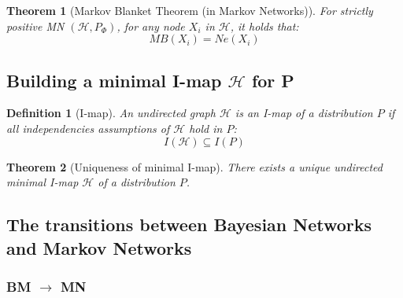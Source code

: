\documentclass[11pt]{article}
\numberwithin{equation}{section}
\theoremstyle{boldStyle}
\theoremstyle{boldBlueStyle}
\theoremstyle{boldPurpleStyle}
\newtheorem{theorem}{Theorem}[section]
\theoremstyle{boldRedStyle}
\newtheorem{definition}{Definition}[section]
\begin{document}
\begin{theorem}[Markov Blanket Theorem (in Markov Networks)]
    For strictly positive MN $(\mathcal{H}, P_{\Phi})$, for any node $X_i$ in $\mathcal{H}$, it holds that:
    \begin{equation*}
        MB(X_i) = Ne(X_i)
    \end{equation*}
\end{theorem}


\subsection{Building a minimal I-map $\mathcal{H}$ for P}

\begin{definition}[I-map]
    An undirected graph $\mathcal{H}$ is an I-map of a distribution $P$ if all independencies assumptions of $\mathcal{H}$ hold in $P$:
    \begin{equation*}
        I(\mathcal{H}) \subseteq I(P)
    \end{equation*}
\end{definition}


\begin{algorithm}[H]
    \SetNoFillComment
    \SetAlgoLined
    \caption{Building a minimal I-map $\mathcal{H}$ for P} \label{algo:build_minimal_imap}
\end{algorithm}


\begin{theorem}[Uniqueness of minimal I-map]
    There exists a unique undirected minimal I-map $\mathcal{H}$ of a distribution $P$.
\end{theorem}


\subsection{The transitions between Bayesian Networks and Markov Networks}

\subsubsection{BM $\rightarrow$ MN}
\end{document}
